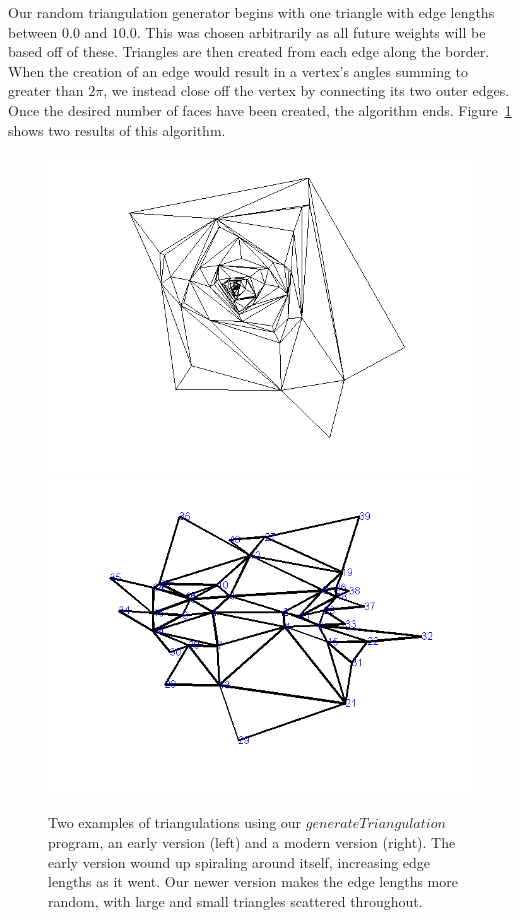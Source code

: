 \documentclass[12pt]{article}
\begin{document}
\noindent Our random triangulation generator begins with one triangle with edge lengths between $0.0$ and $10.0$. This was chosen arbitrarily as all future weights will be based off of these. Triangles are then created from each edge along the border. When the creation of an edge would result in a vertex's angles summing to greater than $2\pi$, we instead close off the vertex by connecting its two outer edges. Once the desired number of faces have been created, the algorithm ends. Figure~\ref{genTris} shows two results of this algorithm.\newline

\begin{figure}
\centering
\includegraphics[scale = 0.45]{Pictures/gentri.png}
\includegraphics[scale = 0.45]{Pictures/gentri6.png}
\caption{Two examples of triangulations using our $generateTriangulation$ program, an early version (left) and a modern version (right). The early version wound up spiraling around itself, increasing edge lengths as it went. Our newer version makes the edge lengths more random, with large and small triangles scattered throughout.}
\label{genTris}
\end{figure}
\end{document}
